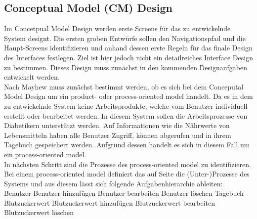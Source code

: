 \subsection{Conceptual Model (CM) Design}
Im Concetpual Model Design werden erste Screens für das zu entwickelnde System designt. Die ersten groben Entwürfe sollen den Navigationspfad und die Haupt-Screens identifizieren und anhand dessen erste Regeln für das finale Design des Interfaces festlegen. Ziel ist hier jedoch nicht ein detailreiches Interface Design zu bestimmen. Dieses Design muss zunächst in den kommenden Designaufgaben entwickelt werden.\\
Nach Mayhew \cite{MD} muss zunächst bestimmt werden, ob es sich bei dem Conceputal Model Design um ein product- oder process-oriented model handelt. Da es in dem zu entwickelnde System keine Arbeitsprodukte, welche vom Benutzer individuell erstellt oder bearbeitet werden. In diesem System sollen die Arbeitsprozesse von Diabetikern unterstützt werden. Auf Informationen wie die Nährwerte von Lebensmitteln haben alle Benutzer Zugriff, können abgerufen und in ihrem Tagebuch gespeichert werden. Aufgrund dessen handelt es sich in diesem Fall um ein process-oriented model.\\
In nächsten Schritt sind die Prozesse des process-oriented model zu identifizieren. Bei einem process-oriented model definiert das  auf Seite \pageref{img:reengineeredTaskOrganizationModel} die (Unter-)Prozesse des Systems und aus diesem lässt sich folgende Aufgabenhierarchie ableiten:\\
Benutzer\newline
\noindent\hspace*{10mm}Benutzer hinzufügen\newline
\noindent\hspace*{10mm}Benutzer bearbeiten\newline
\noindent\hspace*{10mm}Benutzer löschen\newline
Tagebuch\newline
\noindent\hspace*{10mm}Blutzuckerwert\newline
\noindent\hspace*{20mm}Blutzuckerwert hinzufügen\newline
\noindent\hspace*{20mm}Blutzuckerwert bearbeiten\newline
\noindent\hspace*{20mm}Blutzuckerwert löschen\newline
